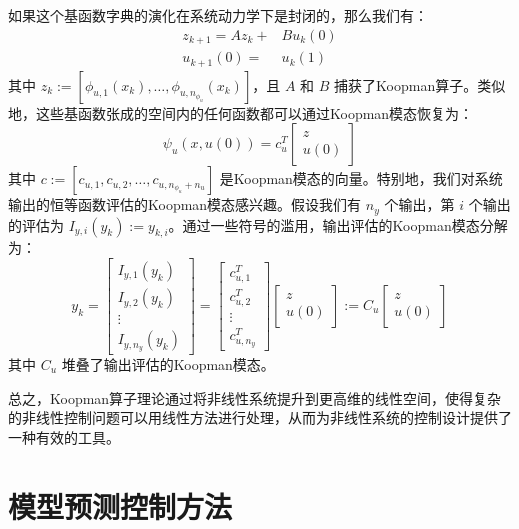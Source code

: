 \documentclass[lang=chs, degree=master, blindreview=false, winfonts=true]{yanputhesis}
\begin{document}
如果这个基函数字典的演化在系统动力学下是封闭的，那么我们有：
\begin{equation}
\begin{aligned}
	z_{k+1}=Az_k+&Bu_k(0)\\u_{k+1}(0)=&u_k(1)
\end{aligned}
\end{equation}
其中 \( z_k := [\phi_{u,1}(x_k), \ldots, \phi_{u,n_{\phi_u}}(x_k)] \)，且 \( A \) 和 \( B \) 捕获了Koopman算子。类似地，这些基函数张成的空间内的任何函数都可以通过Koopman模态恢复为：
\begin{equation}
	\psi_u(x, u(0)) = c_u^T \begin{bmatrix} z \\ u(0) \end{bmatrix}
\end{equation}
其中 \( c := [c_{u,1}, c_{u,2}, \ldots, c_{u,n_{\phi_u} + n_u}] \) 是Koopman模态的向量。特别地，我们对系统输出的恒等函数评估的Koopman模态感兴趣。假设我们有 \( n_y \) 个输出，第 \( i \) 个输出的评估为 \( I_{y,i}(y_k) := y_{k,i} \)。通过一些符号的滥用，输出评估的Koopman模态分解为：
\begin{equation}
	y_k = \begin{bmatrix} I_{y,1}(y_k) \\ I_{y,2}(y_k) \\ \vdots \\ I_{y,n_y}(y_k) \end{bmatrix} = \begin{bmatrix} c_{u,1}^T \\ c_{u,2}^T \\ \vdots \\ c_{u,n_y}^T \end{bmatrix} \begin{bmatrix} z \\ u(0) \end{bmatrix} := C_u \begin{bmatrix} z \\ u(0) \end{bmatrix}
\end{equation}
其中 \( C_u \) 堆叠了输出评估的Koopman模态。

总之，Koopman算子理论通过将非线性系统提升到更高维的线性空间，使得复杂的非线性控制问题可以用线性方法进行处理，从而为非线性系统的控制设计提供了一种有效的工具。

\section{模型预测控制方法}
\end{document}

